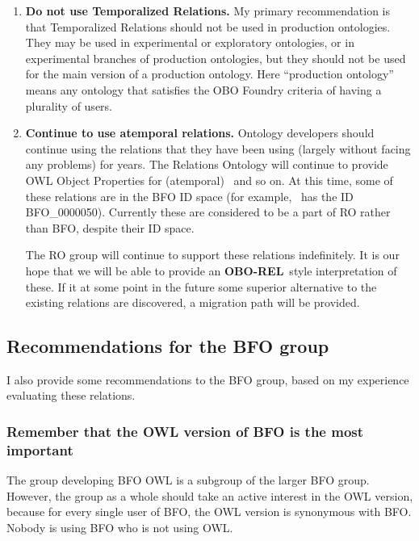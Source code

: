 \documentclass{bioinfo}
\def\partOf{\pr{part\_of}}
\def\OBOREL{\textbf{OBO-REL}}
\begin{document}
\begin{enumerate}

\item \textbf{Do not use Temporalized Relations.} My primary
  recommendation is that Temporalized Relations should not be used in
  production ontologies. They may be used in experimental or
  exploratory ontologies, or in experimental branches of production
  ontologies, but they should not be used for the main version of a
  production ontology. Here ``production ontology'' means any ontology
  that satisfies the OBO Foundry criteria of having a plurality of
  users.

\item \textbf{Continue to use atemporal relations.} Ontology
  developers should continue using the relations that they have been
  using (largely without facing any problems) for years. The Relations
  Ontology will continue to provide OWL Object Properties for
  (atemporal) \partOf\ and so on. At this time, some of these
  relations are in the BFO ID space (for example, \partOf\ has the ID
  BFO\_0000050). Currently these are considered to be a part of RO
  rather than BFO, despite their ID space.

  The RO group will continue to support these relations
  indefinitely. It is our hope that we will be able to provide an
  \OBOREL\ style interpretation of these. If it at some point in the
  future some superior alternative to the existing relations are
  discovered, a migration path will be provided.
  

\end{enumerate}

\subsection{Recommendations for the BFO group}

I also provide some recommendations to the BFO group, based on my
experience evaluating these relations.

\subsubsection{Remember that the OWL version of BFO is the most
  important}

The group developing BFO OWL is a subgroup of the larger BFO
group. However, the group as a whole should take an active interest in
the OWL version, because for every single user of BFO, the OWL version
is synonymous with BFO. Nobody is using BFO who is not using OWL.
\end{document}
